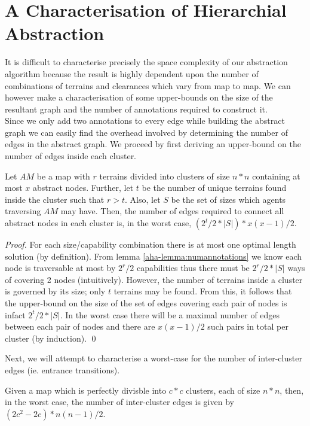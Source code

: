 \section{A Characterisation of Hierarchial Abstraction}
It is difficult to characterise precisely the space complexity of our abstraction algorithm because the result is highly dependent upon the number of combinations of terrains and clearances which vary from map to map. We can however make a characterisation of some upper-bounds on the size of the resultant graph and the number of annotations required to construct it. \\
Since we only add two annotations to every edge while building the abstract graph we can easily find the overhead involved by determining the number of edges in the abstract graph. We proceed by first deriving an upper-bound on the number of edges inside each cluster. 
\begin{lemma}
\label{aha-lemma:maxedgesincluster}
Let $AM$ be a map with $r$ terrains divided into clusters of size $n*n$ containing at most $x$ abstract nodes. Further, let $t$ be the number of unique terrains found inside the cluster such that $r > t$. Also, let $S$ be the set of sizes which agents traversing $AM$ may have. Then, the number of edges required to connect all abstract nodes in each cluster is, in the worst case, $(2^t/2 * |S|) * x(x-1)/2$.
\end{lemma}

\begin{proof}
For each size/capability combination there is at most one optimal length solution (by definition). From lemma \ref{aha-lemma:numannotations} we know each node is traversable at most by $2^r/2$ capabilities thus there must be $2^r/2 * |S|$ ways of covering 2 nodes (intuitively). 
However, the number of terrains inside a cluster is governed by its size; only $t$ terrains may be found. From this, it follows that the upper-bound on the size of the set of edges covering each pair of nodes is infact $2^t/2 * |S|$. In the worst case there will be a maximal number of edges between each pair of nodes and there are $x(x-1)/2$ such pairs in total per cluster (by induction). \qed
\end{proof}

Next, we will attempt to characterise a worst-case for the number of inter-cluster edges (ie. entrance transitions). 
\begin{lemma}
\label{aha-lemma:maxtransitions}
Given a map which is perfectly divisble into $c*c$ clusters, each of size $n*n$, then, in the worst case, the number of inter-cluster edges is given by $(2c^2 - 2c)*n(n-1)/2$.
\end{lemma}

